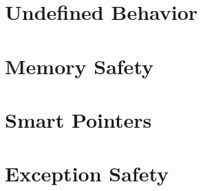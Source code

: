 \documentclass{article}
\title{\thistitle}
\author{\me}
\date{\today}
\begin{document}
\maketitle
\tableofcontents
\pagebreak

\section{Undefined Behavior}

\section{Memory Safety}

\section{Smart Pointers}

\section{Exception Safety}
\end{document}
